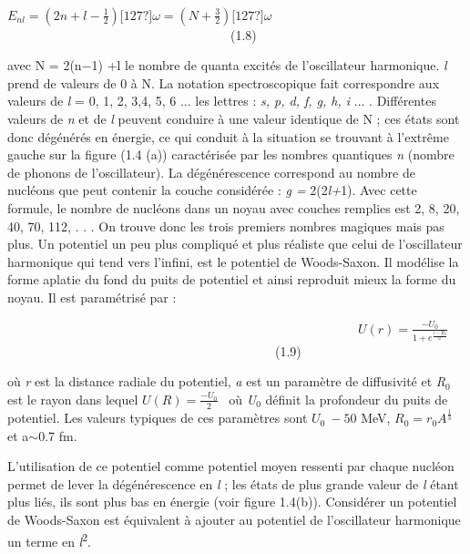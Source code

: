 \documentclass[a4paper]{article}
\providecommand\textsubscript[1]{\ensuremath{{}_{\text{#1}}}}
\begin{document}
\ \ \ \ \ \ \ \ \ \ \ \ \ \ \ \ \ \ \ \ \ \ \ \ \ \ \ \ \ \ \ \ \ \ \ \  $E_{\mathit{nl}}=\left(2n+l-\frac 1
2\right)\mathit{\text{[127?]}\omega }=\left(N+\frac 3 2\right)\mathit{\text{[127?]}\omega
}$\ \ \ \ \ \ \ \ \ \ \ \ \ \ \ \ \ \ \ \ \ \ \ \ \ \ \ \ \ \ \ \ \ \ \ (1.8)

avec N = 2(n$-$1) +l le nombre de quanta excités de l’oscillateur harmonique. \textit{l} prend de valeurs de 0 à N. La
notation spectroscopique fait correspondre aux valeurs de \textit{l} = 0, 1, 2, 3,4, 5, 6 ... les lettres : \textit{s,
p, d, f, g, h, i} ... . Différentes valeurs de \textit{n} et de \textit{l} peuvent conduire à une valeur identique de N
; ces états sont donc dégénérés en énergie, ce qui conduit à la situation se trouvant à l’extrême gauche sur la figure
(1.4 (a)) caractérisée par les nombres quantiques \textit{n} (nombre de phonons de l’oscillateur). La dégénérescence
correspond au nombre de nucléons que peut contenir la couche considérée : \textit{g = }2(2\textit{l+}1). Avec cette
formule, le nombre de nucléons dans un noyau avec couches remplies est 2, 8, 20, 40, 70, 112, . . . On trouve donc les
trois premiers nombres magiques mais pas plus. Un potentiel un peu plus compliqué et plus réaliste que celui de
l’oscillateur harmonique qui tend vers l’infini, est le potentiel de Woods-Saxon. Il modélise la forme aplatie du fond
du puits de potentiel et ainsi reproduit mieux la forme du noyau. Il est paramétrisé par :

\ \ \ \ \ \ \ \ \ \ \ \ \ \ \ \ \ \ \ \ \ \ \ \ \ \ \ \ \ \ \ \ \ \ \ \ \ \ \ \ \ \ \ \ \ \ \ \ \ \ \ \ \ \ \ 
$U\left(r\right)=\frac{-U_0}{1+e^{\frac{r-R_0}
a}}$\ \ \ \ \ \ \ \ \ \ \ \ \ \ \ \ \ \ \ \ \ \ \ \ \ \ \ \ \ \ \ \ \ \ \ \ \ \ \ \ \ \ (1.9)

où \textit{r} est la distance radiale du potentiel, \textit{a} est un paramètre de diffusivité et
\textit{R}\textsubscript{0} est le rayon dans lequel  $U\left(R\right)=\frac{-U_0} 2$ \ où \textit{U}\textsubscript{0}
définit la profondeur du puits de potentiel. Les valeurs typiques de ces paramètres sont  $U_0\ -50$ MeV, 
$R_0=r_0A^{\frac 1 3}$ et a${\sim}$0.7 fm. 

L’utilisation de ce potentiel comme potentiel moyen ressenti par chaque nucléon permet de lever la dégénérescence en
\textit{l} ; les états de plus grande valeur de \textit{l} étant plus liés, ils sont plus bas en énergie (voir figure
1.4(b)). Considérer un potentiel de Woods-Saxon est équivalent à ajouter au potentiel de l’oscillateur harmonique un
terme en \textit{l}\textsuperscript{2}.
\end{document}
